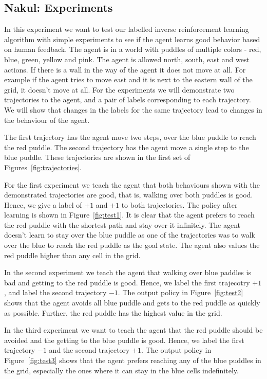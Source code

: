 
\subsection{Nakul: Experiments}

In this experiment we want to test our labelled inverse reinforcement
learning algorithm with simple experiments to see if the agent learns
good behavior based on human feedback.  The agent is in a world with
puddles of multiple colors - red, blue, green, yellow and pink. The
agent is allowed north, south, east and west actions.  If there is a
wall in the way of the agent it does not move at all. For example if
the agent tries to move east and it is next to the eastern wall of the
grid, it doesn't move at all.  For the experiments we will demonstrate
two trajectories to the agent, and a pair of labels corresponding to
each trajectory.  We will show that changes in the labels for the same
trajectory lead to changes in the behaviour of the agent.

The first trajectory has the agent move two steps, over the blue
puddle to reach the red puddle.  The second trajectory has the agent
move a single step to the blue puddle.  These trajectories are shown
in the first set of Figures~\ref{fig:trajectories}.

For the first experiment we teach the agent that both behaviours shown
with the demonstrated trajectories are good, that is, walking over
both puddles is good.  Hence, we give a label of $+1$ and $+1$ to both
trajectories. The policy after learning is shown in
Figure~\ref{fig:test1}.  It is clear that the agent prefers to reach
the red puddle with the shortest path and stay over it infinitely. The
agent doesn't learn to stay over the blue puddle as one of the
trajectories was to walk over the blue to reach the red puddle as the
goal state. The agent also values the red puddle higher than any cell
in the grid.

In the second experiment we teach the agent that walking over blue
paddles is bad and getting to the red puddle is good. Hence, we label
the first trajecotry $+1$, and label the second trajectory $-1$.  The
output policy in Figure~\ref{fig:test2} shows that the agent avoids
all blue puddle and gets to the red puddle as quickly as
possible. Further, the red puddle has the highest value in the grid.

In the third experiment we want to teach the agent that the red puddle
should be avoided and the getting to the blue puddle is good. Hence,
we label the first trajectory $-1$ and the second trajectory $+1$.
The output policy in Figure~\ref{fig:test3} shows that the agent
prefers reaching any of the blue puddles in the grid, especially the
ones where it can stay in the blue cells indefinitely.

